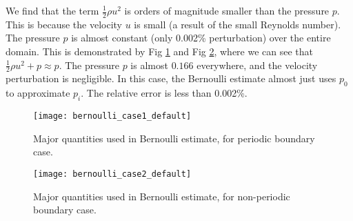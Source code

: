 \graphicspath{ {./JiaweiZhuang/HW2_figures/bernoulli_question/} }

\begin{solution} 

We find that the term $\frac{1}{2} \rho u^2$ is orders of magnitude smaller than the pressure $p$. This is because the velocity $u$ is small (a result of the small Reynolds number). The pressure $p$ is almost constant (only 0.002\% perturbation) over the entire domain. This is demonstrated by Fig \ref{fig:ber_case1} and Fig \ref{fig:ber_case2}, where we can see that $\frac{1}{2} \rho u^2 + p \approx p$. The pressure $p$ is almost $0.166$ everywhere, and the velocity perturbation is negligible. In this case, the Bernoulli estimate almost just uses $p_0$ to approximate $p_i$. The relative error is less than 0.002\%.

\begin{figure}[H]
\texttt{[image: bernoulli\_case1\_default]}
\centering
\caption{Major quantities used in Bernoulli estimate, for periodic boundary case.}
\label{fig:ber_case1}
\end{figure}

\begin{figure}[H]
\texttt{[image: bernoulli\_case2\_default]}
\centering
\caption{Major quantities used in Bernoulli estimate, for non-periodic boundary case.}
\label{fig:ber_case2}
\end{figure}

\end{solution}


